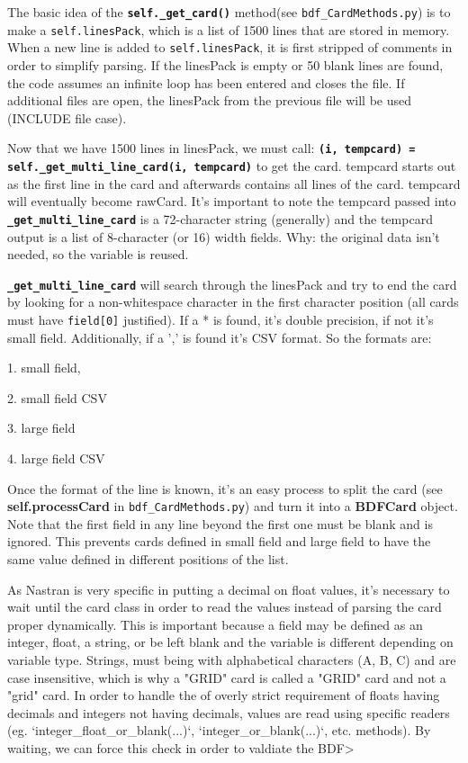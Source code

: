      The basic idea of the {\bf \tt self.\_get\_card()} method(see {\tt bdf\_CardMethods.py}) is to make a {\tt self.linesPack}, which is a list of 1500 lines that are stored in memory.  When a new line is added to {\tt self.linesPack}, it is first stripped of comments in order to simplify parsing.  If the linesPack is empty or 50 blank lines are found, the code assumes an infinite loop has been entered and closes the file.  If additional files are open, the linesPack from the previous file will be used (INCLUDE file case).

     Now that we have 1500 lines in linesPack, we must call:  {\bf \tt (i, tempcard) = self.\_get\_multi\_line\_card(i, tempcard)} to get the card.  tempcard starts out as the first line in the card and afterwards contains all lines of the card. tempcard will eventually become rawCard.  It's important to note the tempcard passed into {\bf \tt \_get\_multi\_line\_card} is a 72-character string (generally) and the tempcard output is a list of 8-character (or 16) width fields.  Why: the original data isn't needed, so the variable is reused.

     {\bf \tt \_get\_multi\_line\_card} will search through the linesPack and try to end the card by looking for a non-whitespace character in the first character position (all cards must have {\tt field[0]} justified).  If a * is found, it's double precision, if not it's small field.  Additionally, if a ',' is found it's CSV format.  So the formats are:

       1. small field,

       2. small field CSV

       3. large field

       4. large field CSV

     Once the format of the line is known, it's an easy process to split the card (see {\bf self.processCard} in {\tt bdf\_CardMethods.py}) and turn it into a {\bf BDFCard} object.  Note that the first field in any line beyond the first one must be blank and is ignored.  This prevents cards defined in small field and large field to have the same value defined in different positions of the list.

     As Nastran is very specific in putting a decimal on float values, it's necessary to wait until the card class in order to read the values instead of parsing the card proper dynamically.  This is important because a field may be defined as an integer, float, a string, or be left blank and the variable is different depending on variable type.  Strings, must being with alphabetical characters (A, B, C) and are case insensitive, which is why a "GRID" card is called a "GRID" card and not a "grid" card.  In order to handle the of overly strict requirement of floats having decimals and integers not having decimals, values are read using specific readers (eg. `integer_float_or_blank(...)`, `integer_or_blank(...)`, etc. methods).  By waiting, we can force this check in order to valdiate the BDF>


